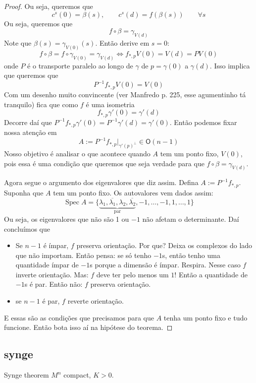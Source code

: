 \begin{proof}
Ou seja, queremos que
\[c^s(0)=\beta(s),\qquad c^s(d)=f(\beta(s))\qquad \forall s\]
Ou seja, queremos que
\[f \circ \beta=\gamma_{V(d)}\]
Note que \(\beta(s)=\gamma_{V(0)}(s)\). Então derive em \(s=0\): 
\[f \circ \beta=f\circ\gamma_{V(0)}=\gamma_{V(d)}\iff f_{*,p}V(0)=V(d)=PV(0)\]
onde \(P\) é o transporte paralelo ao longo de \(\gamma\) de \(p=\gamma(0)\) a \(\gamma(d)\).
Isso implica que queremos que
\[P^{-1}f_{*,p}V(0)=V(0)\]
Com um desenho muito convincente (ver Manfredo p. 225, esse agumentinho tá tranquilo) fica que como \(f\) é uma isometria
\[f_{*,p}\gamma'(0)=\gamma'(d)\]
Decorre daí que \(P^{-1}f_{*,p}\gamma'(0)=P^{-1}\gamma'(d)=\gamma'(0)\). Então podemos fixar nossa atenção em
\[A:=P^{-1}f_{*,p}|_{\gamma'(p)^\perp}\in \mathsf{O}(n-1)\]
Nosso objetivo é analisar o que acontece quando \(A\) tem um ponto fixo, \(V(0)\), pois essa é uma condição que queremos que seja verdade para que \(f\circ \beta = \gamma_{V(d)}\).

Agora segue o argumento dos eigenvalores que diz assim. Defina \(A:=P^{-1}f_{*,p}\). Suponha que \(A\) tem um ponto fixo. Os autovalores vem dados assim:
\[\operatorname{Spec}A=\{\underbrace{\lambda_1,\overline{\lambda_1},\lambda_2,\overline{\lambda_2}}_{\text{par} },-1,\ldots,-1,1,\ldots,1\}\]
Ou seja, os eigenvalores que não são 1 ou \(-1\) não afetam o determinante. Daí concluímos que
\begin{itemize}
\item Se \(n-1\) é ímpar, \(f\) preserva orientação. Por que? Deixa os complexos do lado que não importam. Então pensa: se só tenho \(-1\)s, então tenho uma quantidade ímpar de \(-1\)s porque a dimensão é ímpar. Respira. Nesse caso \(f\) inverte orientação. Mas: \(f\) deve ter pelo menos um \(1\)! Então a quantidade de \(-1\)s  é par. Então não: \(f\) preserva orientação.
\item se \(n-1\) é par, \(f\) reverte orientação.
\end{itemize}
E essas são as condições que precisamos para que \(A\) tenha um ponto fixo e tudo funcione. Então bota isso aí na hipótese do teorema.
\end{proof}

\subsection{synge}

\begin{thing6}{Synge theorem}\leavevmode
\(M^n\) compact, \(K>0\).
\end{thing6}

